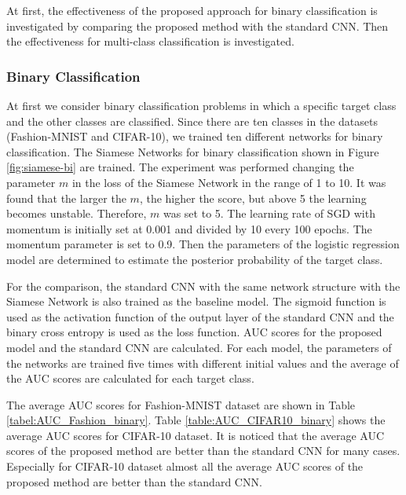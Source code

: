 \documentclass[a4paper,12pt]{article}
\begin{document}
At first, the effectiveness of the proposed approach for binary classification is investigated by comparing the proposed method with the standard CNN. Then the effectiveness for multi-class classification is investigated.
\subsubsection{Binary Classification}
At first we consider binary classification problems in which a specific target class and the other classes are classified.
Since there are ten classes in the datasets (Fashion-MNIST and CIFAR-10), we trained ten different networks for binary classification.
The Siamese Networks for binary classification shown in Figure \ref{fig:siamese-bi} are trained.
The experiment was performed changing the parameter $m$ in the loss of the Siamese Network in the range of 1 to 10.
It was found that the larger the $m$, the higher the score, but above 5 the learning becomes unstable.
Therefore, $m$ was set to 5.
The learning rate of SGD with momentum is initially set at 0.001 and divided by 10 every 100 epochs.
The momentum parameter is set to 0.9.
Then the parameters of the logistic regression model are determined to estimate the posterior probability of the target class.

For the comparison, the standard CNN with the same network structure with the Siamese Network is also trained as the baseline model.
The sigmoid function is used as the activation function of the output layer of the standard CNN and the binary cross entropy is used as the loss function.
AUC scores for the proposed model and the standard CNN are calculated.
For each model, the parameters of the networks are trained five times with different initial values and the average of the AUC scores are calculated for each target class.

The average AUC scores for Fashion-MNIST dataset are shown in Table \ref{tabel:AUC_Fashion_binary}.
Table \ref{table:AUC_CIFAR10_binary} shows the average AUC scores for CIFAR-10 dataset.
It is noticed that the average AUC scores of the proposed method are better than the standard CNN for many cases.
Especially for CIFAR-10 dataset almost all the average AUC scores of the proposed method are better than the standard CNN. 


\end{document}
